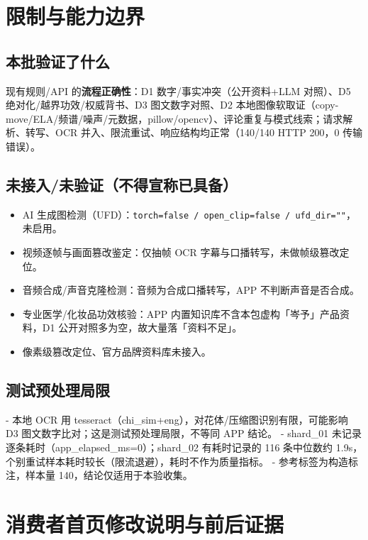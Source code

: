 \documentclass[11pt,a4paper]{ctexart}
\begin{document}
\section{限制与能力边界}

\subsection{本批验证了什么}
现有规则/API 的\textbf{流程正确性}：D1 数字/事实冲突（公开资料+LLM 对照）、D5 绝对化/越界功效/权威背书、D3 图文数字对照、D2 本地图像软取证（copy-move/ELA/频谱/噪声/元数据，pillow/opencv）、评论重复与模式线索；请求解析、转写、OCR 并入、限流重试、响应结构均正常（140/140 HTTP 200，0 传输错误）。

\subsection{未接入/未验证（不得宣称已具备）}
\begin{itemize}
\item AI 生成图检测（UFD）：\texttt{torch=false / open\_clip=false / ufd\_dir=""}，未启用。
\item 视频逐帧与画面篡改鉴定：仅抽帧 OCR 字幕与口播转写，未做帧级篡改定位。
\item 音频合成/声音克隆检测：音频为合成口播转写，APP 不判断声音是否合成。
\item 专业医学/化妆品功效核验：APP 内置知识库不含本包虚构「岑予」产品资料，D1 公开对照多为空，故大量落「资料不足」。
\item 像素级篡改定位、官方品牌资料库未接入。
\end{itemize}

\subsection{测试预处理局限}
- 本地 OCR 用 tesseract（chi\_sim+eng），对花体/压缩图识别有限，可能影响 D3 图文数字比对；这是测试预处理局限，不等同 APP 结论。
- shard\_01 未记录逐条耗时（app\_elapsed\_ms=0）；shard\_02 有耗时记录的 116 条中位数约 1.9s，个别重试样本耗时较长（限流退避），耗时不作为质量指标。
- 参考标签为构造标注，样本量 140，结论仅适用于本验收集。

\section{消费者首页修改说明与前后证据}
\end{document}
